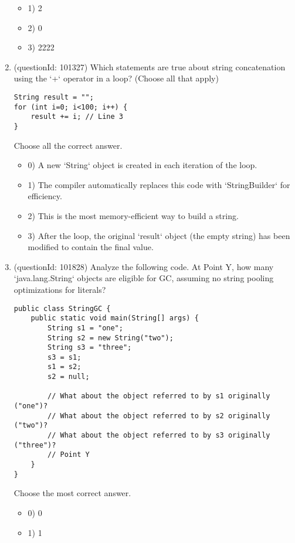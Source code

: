 \documentclass[12pt]{article}
\begin{document}
\begin{enumerate}[label=(\arabic*)]
\begin{itemize}
\item 1) 2

\item 2) 0

\item 3) 2222

\end{itemize}
\item (questionId: 101327) Which statements are true about string concatenation using the `+` operator in a loop? (Choose all that apply)
\begin{verbatim}
String result = "";
for (int i=0; i<100; i++) {
    result += i; // Line 3
}
\end{verbatim}
Choose all the correct answer.\begin{itemize}
\item 0) A new `String` object is created in each iteration of the loop.

\item 1) The compiler automatically replaces this code with `StringBuilder` for efficiency.

\item 2) This is the most memory-efficient way to build a string.

\item 3) After the loop, the original `result` object (the empty string) has been modified to contain the final value.

\end{itemize}
\item (questionId: 101828) Analyze the following code. At Point Y, how many `java.lang.String` objects are eligible for GC, assuming no string pooling optimizations for literals?
\begin{verbatim}
public class StringGC {
    public static void main(String[] args) {
        String s1 = "one";
        String s2 = new String("two");
        String s3 = "three";
        s3 = s1;
        s1 = s2;
        s2 = null;

        // What about the object referred to by s1 originally ("one")?
        // What about the object referred to by s2 originally ("two")?
        // What about the object referred to by s3 originally ("three")?
        // Point Y
    }
}
\end{verbatim}
Choose the most correct answer. 
\begin{itemize}
\item 0) 0

\item 1) 1


\end{itemize}
\end{enumerate}
\end{document}

